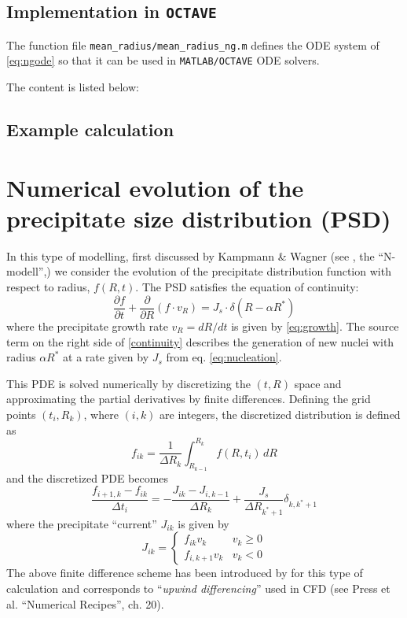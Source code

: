 \documentclass[12pt,a4paper]{article}
\begin{document}
\subsection{Implementation in \texttt{OCTAVE}}

The function file \texttt{mean\_radius/mean\_radius\_ng.m} defines the ODE system of \eqref{eq:ngode} so that it can be used in \texttt{MATLAB/OCTAVE} ODE solvers.

The content is listed below: 



\subsection{Example calculation}



\section{Numerical evolution of the precipitate size distribution (PSD)}

In this type of modelling, first discussed by Kampmann \& Wagner (see \citet{Wagner-2005-HomogeneousSecond-P}, the ``N-modell'',) we consider the evolution of the precipitate distribution function with respect to radius, $f(R,t)$. The PSD satisfies the equation of continuity:
\begin{equation}
\label{continuity}
\frac{\partial f}{\partial t} + \frac{\partial }{\partial R} (f \cdot v_R) = J_s \cdot \delta(R - \alpha R^*)
\end{equation}
where the precipitate growth rate $v_R = dR/dt$ is given by \eqref{eq:growth}. The source term on the right side of \eqref{continuity} describes the generation of new nuclei with radius $\alpha R^*$ at a rate given by $J_s$ from eq. \eqref{eq:nucleation}.

This PDE is solved numerically by discretizing the $(t,R)$ space and approximating the partial derivatives by finite differences. Defining the grid points $(t_i, R_k)$, where $(i,k)$ are integers, the discretized distribution is defined as
\begin{equation}
f_{ik} = \frac{1}{\Delta R_k} \int_{R_{k-1}}^{R_k}f(R,t_i)\,dR
\end{equation}
and the discretized PDE becomes
\begin{equation}
\label{PDE}
\frac{f_{i+1,k} - f_{ik}}{\Delta t_i} = - \frac{J_{ik} - J_{i,k-1}}{\Delta R_k} + \frac{J_s}{\Delta R_{k^*+1}} \delta_{k,k^*+1}
\end{equation}
where the precipitate ``current'' $J_{ik}$ is given by
\begin{equation} 
J_{ik} = 
\begin{cases}
f_{ik}v_k & v_k \geq 0 \\
f_{i,k+1}v_k & v_k<0
\end{cases}
\end{equation}
The above finite difference scheme has been introduced by \citet{Myhr-2000-Modellingofnon-iso} for this type of calculation and corresponds to ``\textit{upwind differencing}'' used in CFD (see Press et al. ``Numerical Recipes'', ch. 20).
\end{document}
